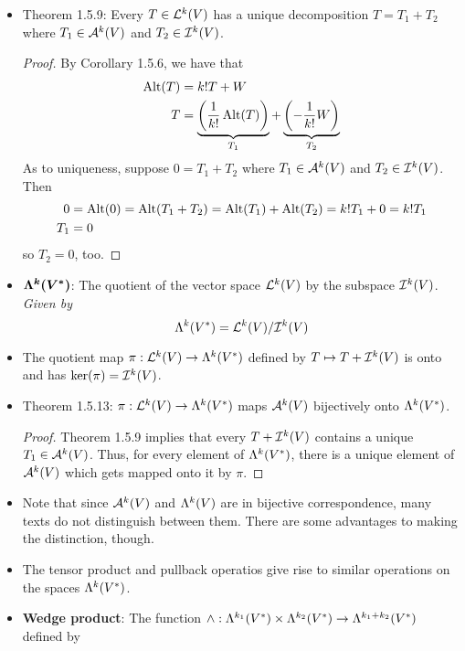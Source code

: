 \documentclass[../notes.tex]{subfiles}
\begin{document}
\begin{itemize}
\begin{proof}
    \end{proof}
    \item Theorem 1.5.9: Every $T\in\lin[k]{V}$ has a unique decomposition $T=T_1+T_2$ where $T_1\in\alt[k]{V}$ and $T_2\in\ide[k]{V}$.
    \begin{proof}
        By Corollary 1.5.6, we have that
        \begin{align*}
            \Alt(T) &= k!T+W\\
            T &= \underbrace{\left( \frac{1}{k!}\Alt(T) \right)}_{T_1}+\underbrace{\left( -\frac{1}{k!}W \right)}_{T_2}
        \end{align*}
        As to uniqueness, suppose $0=T_1+T_2$ where $T_1\in\alt[k]{V}$ and $T_2\in\ide[k]{V}$. Then
        \begin{align*}
            0 &= \Alt(0)
                = \Alt(T_1+T_2)
                = \Alt(T_1)+\Alt(T_2)
                = k!T_1+0
                = k!T_1\\
            T_1 &= 0
        \end{align*}
        so $T_2=0$, too.
    \end{proof}
    \item $\bm{\lam[k]{V^*}}$: The quotient of the vector space $\lin[k]{V}$ by the subspace $\ide[k]{V}$. \emph{Given by}
    \begin{equation*}
        \lam[k]{V^*} = \lin[k]{V}/\ide[k]{V}
    \end{equation*}
    \item The quotient map $\pi:\lin[k]{V}\to\lam[k]{V^*}$ defined by $T\mapsto T+\ide[k]{V}$ is onto and has $\ker(\pi)=\ide[k]{V}$.
    \item Theorem 1.5.13: $\pi:\lin[k]{V}\to\lam[k]{V^*}$ maps $\alt[k]{V}$ bijectively onto $\lam[k]{V^*}$.
    \begin{proof}
        Theorem 1.5.9 implies that every $T+\ide[k]{V}$ contains a unique $T_1\in\alt[k]{V}$. Thus, for every element of $\lam[k]{V^*}$, there is a unique element of $\alt[k]{V}$ which gets mapped onto it by $\pi$.
    \end{proof}
    \item Note that since $\alt[k]{V}$ and $\lam[k]{V}$ are in bijective correspondence, many texts do not distinguish between them. There are some advantages to making the distinction, though.
    \item The tensor product and pullback operatios give rise to similar operations on the spaces $\lam[k]{V^*}$.
    \item \textbf{Wedge product}: The function $\wedge:\lam[k_1]{V^*}\times\lam[k_2]{V^*}\to\lam[k_1+k_2]{V^*}$ defined by

\end{itemize}
\end{document}
